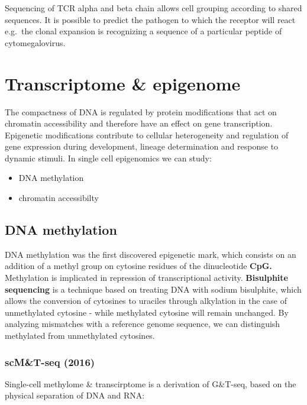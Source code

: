 Sequencing of TCR alpha and beta chain allows cell grouping according to
shared sequences. It is possible to predict the pathogen to which the
receptor will react e.g.~the clonal expansion is recognizing a sequence
of a particular peptide of cytomegalovirus.

\hypertarget{transcriptome-epigenome}{%
\section{Transcriptome \& epigenome}\label{transcriptome-epigenome}}

The compactness of DNA is regulated by protein modifications that act on
chromatin accessibility and therefore have an effect on gene
transcription. Epigenetic modifications contribute to cellular
heterogeneity and regulation of gene expression during development,
lineage determination and response to dynamic stimuli. In single cell
epigenomics we can study:

\begin{itemize}
\tightlist
\item
  DNA methylation
\item
  chromatin accessibilty
\end{itemize}

\hypertarget{dna-methylation}{%
\subsection{DNA methylation}\label{dna-methylation}}

DNA methylation was the first discovered epigenetic mark, which consists
on an addition of a methyl group on cytosine residues of the
dinucleotide \textbf{CpG.} Methylation is implicated in repression of
transcriptional activity. \textbf{Bisulphite sequencing} is a technique
based on treating DNA with sodium bisulphite, which allows the
conversion of cytosines to uraciles through alkylation in the case of
unmethylated cytosine - while methylated cytosine will remain unchanged.
By analyzing mismatches with a reference genome sequence, we can
distinguish methylated from unmethylated cytosines.

\hypertarget{scmt-seq-2016}{%
\subsubsection{scM\&T-seq (2016)}\label{scmt-seq-2016}}

Single-cell methylome \& transcirptome is a derivation of G\&T-seq,
based on the physical separation of DNA and RNA:


